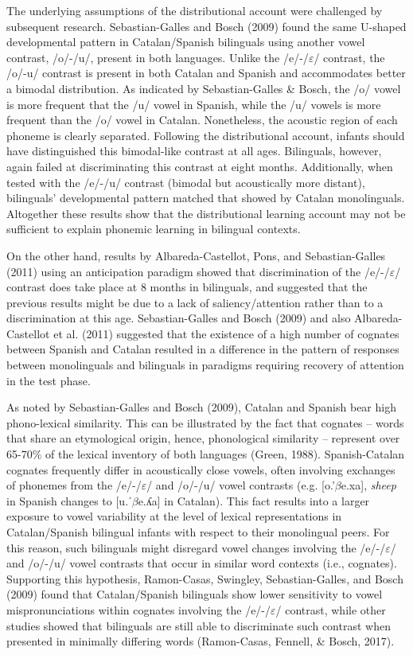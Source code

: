 \documentclass[man,floatsintext]{apa6}
\begin{document}
The underlying assumptions of the distributional account were challenged by subsequent research. Sebastian-Galles and Bosch (2009) found the same U-shaped developmental pattern in Catalan/Spanish bilinguals using another vowel contrast, /o/-/u/, present in both languages. Unlike the /e/-/\(\varepsilon\)/ contrast, the /o/-u/ contrast is present in both Catalan and Spanish and accommodates better a bimodal distribution. As indicated by Sebastian-Galles \& Bosch, the /o/ vowel is more frequent that the /u/ vowel in Spanish, while the /u/ vowels is more frequent than the /o/ vowel in Catalan. Nonetheless, the acoustic region of each phoneme is clearly separated. Following the distributional account, infants should have distinguished this bimodal-like contrast at all ages. Bilinguals, however, again failed at discriminating this contrast at eight months. Additionally, when tested with the /e/-/u/ contrast (bimodal but acoustically more distant), bilinguals' developmental pattern matched that showed by Catalan monolinguals. Altogether these results show that the distributional learning account may not be sufficient to explain phonemic learning in bilingual contexts.

On the other hand, results by Albareda-Castellot, Pons, and Sebastian-Galles (2011) using an anticipation paradigm showed that discrimination of the /e/-/\(\varepsilon\)/ contrast does take place at 8 months in bilinguals, and suggested that the previous results might be due to a lack of saliency/attention rather than to a discrimination at this age. Sebastian-Galles and Bosch (2009) and also Albareda-Castellot et al. (2011) suggested that the existence of a high number of cognates between Spanish and Catalan resulted in a difference in the pattern of responses between monolinguals and bilinguals in paradigms requiring recovery of attention in the test phase.

As noted by Sebastian-Galles and Bosch (2009), Catalan and Spanish bear high phono-lexical similarity. This can be illustrated by the fact that cognates -- words that share an etymological origin, hence, phonological similarity -- represent over 65-70\% of the lexical inventory of both languages (Green, 1988). Spanish-Catalan cognates frequently differ in acoustically close vowels, often involving exchanges of phonemes from the /e/-/\(\varepsilon\)/ and /o/-/u/ vowel contrasts (e.g. {[}o.'\(\beta\)e.xa{]}, \emph{sheep} in Spanish changes to {[}u.ˈ\(\beta\)e.ʎa{]} in Catalan). This fact results into a larger exposure to vowel variability at the level of lexical representations in Catalan/Spanish bilingual infants with respect to their monolingual peers. For this reason, such bilinguals might disregard vowel changes involving the /e/-/\(\varepsilon\)/ and /o/-/u/ vowel contrasts that occur in similar word contexts (i.e., cognates). Supporting this hypothesis, Ramon-Casas, Swingley, Sebastian-Galles, and Bosch (2009) found that Catalan/Spanish bilinguals show lower sensitivity to vowel mispronunciations within cognates involving the /e/-/\(\varepsilon\)/ contrast, while other studies showed that bilinguals are still able to discriminate such contrast when presented in minimally differing words (Ramon-Casas, Fennell, \& Bosch, 2017).
\end{document}
